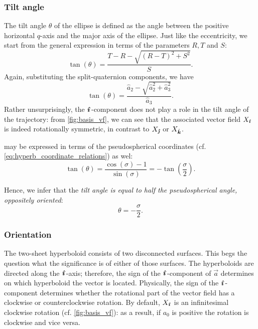 \subsubsection{Tilt angle} The tilt angle \(\theta\) of the ellipse is defined as the angle between the positive horizontal \(q\)-axis and the major axis of the ellipse. Just like the eccentricity, we start from the general expression in terms of the parameters \(R, T\) and \(S\):
\begin{equation}
    \tan(\theta) = \frac{T - R - \sqrt{(R - T)^2 + S^2}}{S}.
\end{equation}
Again, substituting the split-quaternion components, we have
\begin{equation}
    \tan(\theta) = \frac{\hat{a}_2 - \sqrt{\hat{a}_2^2 + \hat{a}_3^2}}{\hat{a}_3}.
    \label{eq:tilt_angle}
\end{equation}
Rather unsurprisingly, the \(\quati\)-component does not play a role in the tilt angle of the trajectory: from \cref{fig:basis_vf}, we can see that the associated vector field \(X_\quati\) is indeed rotationally symmetric, in contrast to \(X_\quatj\) or \(X_\quatk\).

 may be expressed in terms of the pseudospherical coordinates (cf. \cref{eq:hyperb_coordinate_relations}) as wel:
\begin{equation}
     \tan(\theta) = \frac{\cos(\sigma) - 1}{\sin(\sigma)} = -\tan(\frac{\sigma}{2}).
\end{equation}

Hence, we infer that the \emph{tilt angle is equal to half the pseudospherical angle, oppositely oriented}:
\begin{equation}
     \theta = -\frac{\sigma}{2}.
\end{equation}

\subsubsection{Orientation} 
The two-sheet hyperboloid consists of two disconnected surfaces. This begs the question what the significance is of either of those surfaces. The hyperboloids are directed along the \(\quati\)-axis; therefore, the sign of the \(\quati\)-component of \(\vec{a}\) determines on which hyperboloid the vector is located. Physically, the sign of the \(\quati\)-component determines whether the rotational part of the vector field has a clockwise or counterclockwise rotation. By default, \(X_\quati\) is an infinitesimal clockwise rotation (cf. \cref{fig:basis_vf}): as a result, if \(a_0\) is positive the rotation is clockwise and vice versa.

